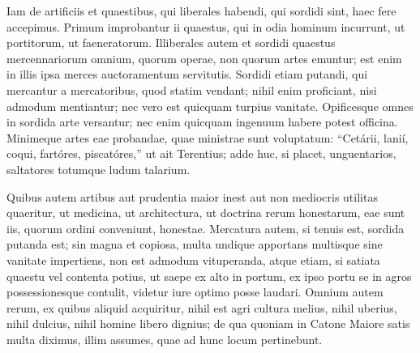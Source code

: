 
Iam de artificiis et quaestibus, qui liberales habendi, qui sordidi sint, haec fere accepimus. Primum improbantur ii quaestus, qui in odia hominum incurrunt, ut portitorum, ut faeneratorum. Illiberales autem et sordidi quaestus mercennariorum omnium, quorum operae, non quorum artes emuntur; est enim in illis ipsa merces auctoramentum servitutis. Sordidi etiam putandi, qui mercantur a mercatoribus, quod statim vendant; nihil enim proficiant, nisi admodum mentiantur; nec vero est quicquam turpius vanitate. Opificesque omnes in sordida arte versantur; nec enim quicquam ingenuum habere potest officina. Minimeque artes eae probandae, quae ministrae sunt voluptatum: ``Cetárii, lanií, coqui, fartóres, piscatóres,'' ut ait Terentius; adde huc, si placet, unguentarios, saltatores totumque ludum talarium.

Quibus autem artibus aut prudentia maior inest aut non mediocris utilitas quaeritur, ut medicina, ut architectura, ut doctrina rerum honestarum, eae sunt iis, quorum ordini conveniunt, honestae. Mercatura autem, si tenuis est, sordida putanda est; sin magna et copiosa, multa undique apportans multisque sine vanitate impertiens, non est admodum vituperanda, atque etiam, si satiata quaestu vel contenta potius, ut saepe ex alto in portum, ex ipso portu se in agros possessionesque contulit, videtur iure optimo posse laudari. Omnium autem rerum, ex quibus aliquid acquiritur, nihil est agri cultura melius, nihil uberius, nihil dulcius, nihil homine libero dignius; de qua quoniam in Catone Maiore satis multa diximus, illim assumes, quae ad hunc locum pertinebunt.



